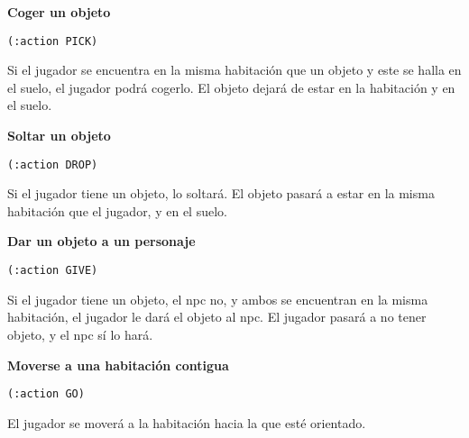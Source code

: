 \documentclass[11pt,a4paper]{article}
\begin{document}
\medskip

\large{\textbf{Coger un objeto}}

\texttt{(:action PICK)}

\smallskip

Si el jugador se encuentra en la misma habitación que un objeto y este se halla en el suelo,
el jugador podrá cogerlo. El objeto dejará de estar en la habitación y en el suelo.

\medskip

\large{\textbf{Soltar un objeto}}

\texttt{(:action DROP)}

\smallskip

Si el jugador tiene un objeto, lo soltará. El objeto pasará a estar en la misma habitación que el jugador,
y en el suelo.

\medskip

\large{\textbf{Dar un objeto a un personaje}}

\texttt{(:action GIVE)}

\smallskip

Si el jugador tiene un objeto, el npc no, y ambos se encuentran en la misma habitación, el jugador le dará 
el objeto al npc. El jugador pasará a no tener objeto, y el npc sí lo hará. 

\medskip
\large{\textbf{Moverse a una habitación contigua}}

\texttt{(:action GO)}

\smallskip

El jugador se moverá a la habitación hacia la que esté orientado.

\medskip
\end{document}
